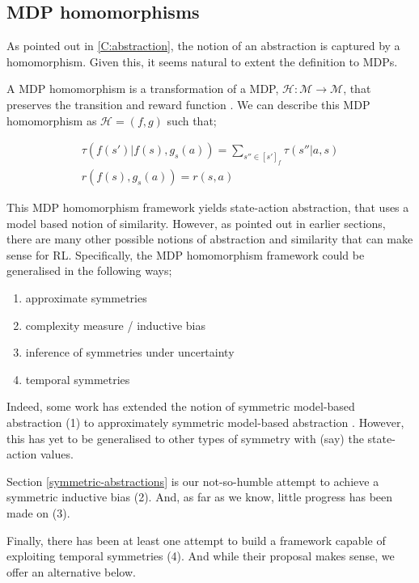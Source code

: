 \subsection{MDP homomorphisms}\label{mdp-homomorphism}

As pointed out in \ref{C:abstraction}, the notion of an abstraction is captured by a homomorphism.
Given this, it seems natural to extent the definition to MDPs.

A MDP homomorphism is a transformation of a MDP, $\mathcal H: \mathcal M\to \mathcal M$, that preserves the transition and reward function \cite{Ravindran2002}. We can describe this MDP homomorphism as $\mathcal H = (f, g)$ such that;

\begin{align}
\tau(f(s')|f(s), g_s(a)) = \sum_{s''\in [s']_f} \tau(s''| a, s) \\
r(f(s), g_s(a)) = r(s, a)
\end{align}

This MDP homomorphism framework yields state-action abstraction, that uses a model based notion of similarity.
However, as pointed out in earlier sections, there are many other possible
notions of abstraction and similarity that can make sense for RL. Specifically, the MDP homomorphism framework
could be generalised in the following ways;

\begin{enumerate}
\tightlist
  \item approximate symmetries
  \item complexity measure / inductive bias
  \item inference of symmetries under uncertainty
  \item temporal symmetries
\end{enumerate}

Indeed, some work has extended the notion of symmetric model-based abstraction (1)
to approximately symmetric model-based abstraction \cite{Ravindran2004}. However, this has yet to be generalised to other types of symmetry with (say) the state-action values.

Section \ref{symmetric-abstractions} is our not-so-humble attempt to achieve a symmetric inductive bias (2). And, as far as we know, little progress has been made on (3).

Finally, there has been at least one attempt \cite{Ravindran2003} to build a framework capable of exploiting temporal symmetries (4). And while their proposal makes sense, we offer an alternative below.

